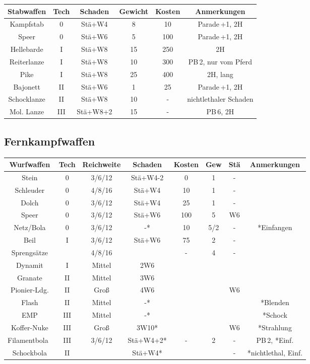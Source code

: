 \documentclass[10pt,a4paper]{report}
\begin{document}
\begin{table}
\begin{tabular}{|c|c|c|c|c|c|}
\hline 
\textbf{Stabwaffen} & Tech & Schaden & Gewicht & Kosten & Anmerkungen \\ 
\hline 
Kampfstab & 0 & Stä+W4 & 8 & 10 & Parade\,+1, 2H \\
\hline
Speer & 0 & Stä+W6 & 5 & 100 & Parade\,+1, 2H \\ 
\hline 
Hellebarde & I & Stä+W8 & 15 & 250 & 2H \\
\hline 
Reiterlanze & I & Stä+W8 & 10 & 300 & PB\,2, nur vom Pferd \\ 
\hline 
Pike & I & Stä+W8 & 25 & 400 & 2H, lang \\ 
\hline 
Bajonett & II & Stä+W6 & 1 & 25 & Parade\,+1, 2H \\ 
\hline 
Schocklanze & II & Stä+W8 & 10 & - & nichtlethaler Schaden \\ 
\hline 
Mol. Lanze & III & Stä+W8+2 & 15 & - & PB\,6, 2H \\ 
\hline 
\end{tabular} 
\end{table}


\subsection*{Fernkampfwaffen}
\begin{table}
\begin{tabular}{|c|c|c|c|c|c|c|c|}
\hline 
\textbf{Wurfwaffen} & Tech & Reichweite & Schaden &  Kosten & Gew & Stä & Anmerkungen \\ 
\hline 
Stein & 0 & 3/6/12 & Stä+W4-2 & 0 & 1 & - &  \\ 
\hline 
Schleuder & 0 & 4/8/16 & Stä+W4 & 10 & 1 & - &  \\ 
\hline 
Dolch & 0 & 3/6/12 & Stä+W4 & 25 & 1 & - &  \\ 
\hline 
Speer & 0 & 3/6/12 & Stä+W6 & 100 & 5 & W6 & \\ 
\hline 
Netz/Bola & 0 & 3/6/12 & -* & 10 & 5/2 & - & *Einfangen \\ 
\hline 
Beil & I & 3/6/12 & Stä+W6 & 75 & 2 & - & \\ 
\hline 
Sprengsätze & & 4/8/16 & & - & 4 & - & \\ 
Dynamit & I & Mittel & 2W6 & & & & \\
Granate & II & Mittel & 3W6 & & & & \\
Pionier-Ldg. & II & Groß & 4W6 & & & W6 & \\
Flash & II & Mittel & -* & & & & *Blenden \\
EMP & III & Mittel & -* & & & & *Schock \\
Koffer-Nuke & III & Groß & 3W10* & & & W6 & *Strahlung\\
\hline 
Filamentbola\ & III & 3/6/12 & Stä+W4+2* & - & 2 & - & PB\,2, *Einf. \\ 
Schockbola & II & & Stä+W4* & & & - & *nichtlethal, Einf. \\ 
\hline
\end{tabular}
\end{table}
\end{document}
